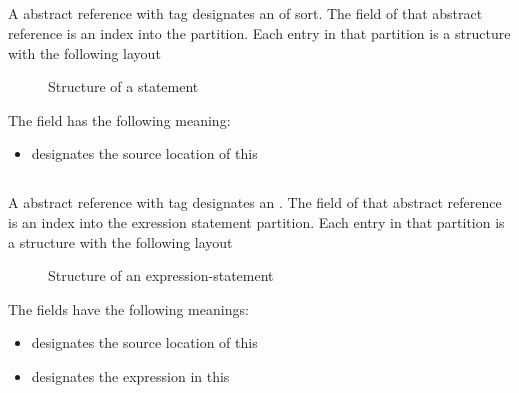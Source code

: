 
\subsection{}
\label{sec:ifc:StmtSort:Continue}

A  abstract reference with tag  designates an  of  sort.
The  field of that abstract reference is an index into the  partition.
Each entry in that partition is a structure with the following layout
%
\begin{figure}[H]
	\centering
	\caption{Structure of a  statement}
	\label{fig:ifc-continue-stmt-structure}
\end{figure}
%
The field has the following meaning:
\begin{itemize}
	\item {} designates the source location of this 
\end{itemize}


\subsection{}
\label{sec:ifc:StmtSort:Expr}

A  abstract reference with tag  designates an .
The  field of that abstract reference is an index into the exression statement partition.
Each entry in that partition is a structure with the following layout
%
\begin{figure}[H]
	\centering
	\caption{Structure of an expression-statement}
	\label{fig:ifc-expr-stmt-structure}
\end{figure}
%
The fields have the following meanings:
\begin{itemize}
	\item {} designates the source location of this 
	\item {} designates the expression in this 
\end{itemize}

